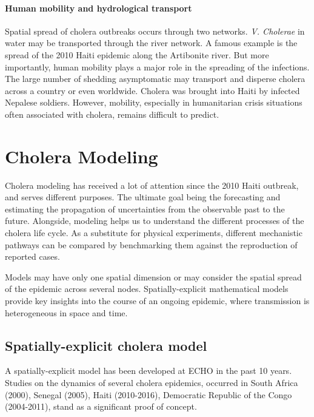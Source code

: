 \paragraph{Human mobility and hydrological transport} Spatial spread of cholera outbreaks occurs through two networks. \textit{V. Cholerae} in water may be transported through the river network. A famous example is the spread of the 2010 Haiti epidemic along the Artibonite river\cite{Gaudart:SpatioTemporalDynamicsCholera:2013}. But more importantly, human mobility plays a major role in the spreading of the infections. The large number of shedding asymptomatic may transport and disperse cholera across a country or even worldwide.  Cholera was brought into Haiti by infected Nepalese soldiers. However, mobility, especially in humanitarian crisis situations often associated with cholera, remains difficult to predict\cite{Lu:PredictabilityPopulationDisplacement:2012,Riley:LargeScaleSpatialTransmissionModels:2007,Bengtsson:ImprovedResponseDisasters:2011,Rebaudet:DrySeasonHaiti:2013}.

\section{Cholera Modeling}
Cholera modeling has received a lot of attention since the 2010 Haiti outbreak, and serves different purposes. The ultimate goal being  the forecasting and estimating the propagation of uncertainties from the observable past to the future. Alongside, modeling helps us to understand the different processes of the cholera life cycle. As a substitute for physical experiments, different mechanistic pathways can be compared by benchmarking them against the reproduction of reported cases. %

Models may have only one spatial dimension or may consider the spatial spread of the epidemic across several nodes. Spatially-explicit mathematical models provide key insights into the course of an ongoing epidemic, where transmission is heterogeneous in space and time.

\subsection{Spatially-explicit cholera model}
A spatially-explicit model has been developed at ECHO in the past 10 years\cite{Bertuzzo:SpacetimeEvolutionCholera:2008}. Studies on the dynamics of several cholera epidemics, occurred in South Africa (2000)\cite{Mari:ModellingCholeraEpidemics:2012}, Senegal (2005), Haiti (2010-2016)\cite{Bertuzzo:PredictionSpatialEvolution:2011}, Democratic Republic of the Congo  (2004-2011), stand as a significant proof of concept.  %

